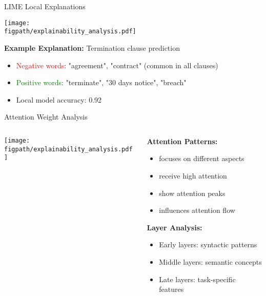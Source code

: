 \begin{frame}{LIME Local Explanations}
\begin{center}
\texttt{[image: \\figpath/explainability\_analysis.pdf]}
\end{center}

\textbf{Example Explanation:} Termination clause prediction
\begin{itemize}
    \item \textcolor{red}{Negative words}: "agreement", "contract" (common in all clauses)
    \item \textcolor{green}{Positive words}: "terminate", "30 days notice", "breach"
    \item Local model accuracy: 0.92
\end{itemize}
\end{frame}

\begin{frame}{Attention Weight Analysis}
\begin{columns}
\begin{column}{0.6\textwidth}
\begin{center}
\texttt{[image: \\figpath/explainability\_analysis.pdf]}
\end{center}
\end{column}
\begin{column}{0.4\textwidth}
\textbf{Attention Patterns:}
\begin{itemize}
    \item {} focuses on different aspects
    \item {} receive high attention
    \item {} show attention peaks
    \item {} influences attention flow
\end{itemize}

\vspace{0.5cm}
\textbf{Layer Analysis:}
\begin{itemize}
    \item Early layers: syntactic patterns
    \item Middle layers: semantic concepts
    \item Late layers: task-specific features
\end{itemize}
\end{column}
\end{columns}
\end{frame}

